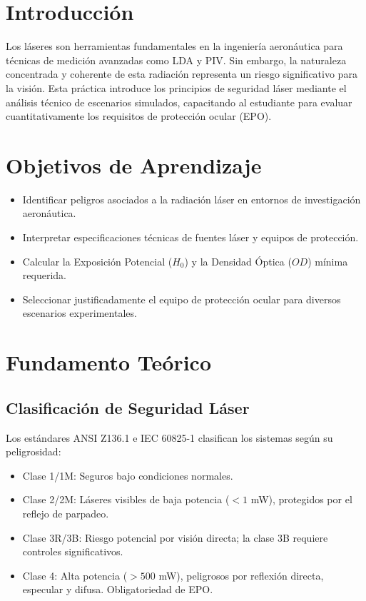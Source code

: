 \documentclass[11pt, a4paper]{article}
\begin{document}
\section{Introducción}
Los láseres son herramientas fundamentales en la ingeniería aeronáutica para técnicas de medición avanzadas como LDA y PIV. Sin embargo, la naturaleza concentrada y coherente de esta radiación representa un riesgo significativo para la visión. Esta práctica introduce los principios de seguridad láser mediante el análisis técnico de escenarios simulados, capacitando al estudiante para evaluar cuantitativamente los requisitos de protección ocular (EPO).

\section{Objetivos de Aprendizaje}
\begin{itemize}[label=-]
	\item Identificar peligros asociados a la radiación láser en entornos de investigación aeronáutica.
	\item Interpretar especificaciones técnicas de fuentes láser y equipos de protección.
	\item Calcular la Exposición Potencial ($H_0$) y la Densidad Óptica ($OD$) mínima requerida.
	\item Seleccionar justificadamente el equipo de protección ocular para diversos escenarios experimentales.
\end{itemize}

\section{Fundamento Teórico}

\subsection{Clasificación de Seguridad Láser}
Los estándares ANSI Z136.1 e IEC 60825-1 clasifican los sistemas según su peligrosidad:
\begin{itemize}
	\item Clase 1/1M: Seguros bajo condiciones normales.
	\item Clase 2/2M: Láseres visibles de baja potencia ($<1$ mW), protegidos por el reflejo de parpadeo.
	\item Clase 3R/3B: Riesgo potencial por visión directa; la clase 3B requiere controles significativos.
	\item Clase 4: Alta potencia ($>500$ mW), peligrosos por reflexión directa, especular y difusa. Obligatoriedad de EPO.
\end{itemize}
\end{document}
